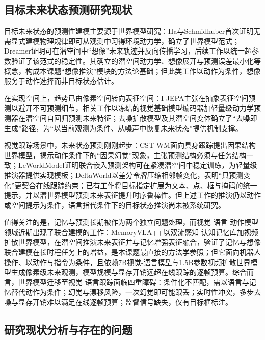 \subsection{目标未来状态预测研究现状}

目标未来状态的预测性建模主要源于世界模型研究：Ha与Schmidhuber\cite{ha2018worldmodels}首次证明无需显式建模物理规律即可从观测中习得环境动力学，确立了世界模型范式；Dreamer\cite{hafner2020dreamer}证明可在潜空间中“想像”未来轨迹并反向传播学习，后续工作以统一超参数验证了该范式的稳定性\cite{hafner2025mastering}。其确立的潜空间动力学、想像展开与预测误差最小化等概念，构成本课题“想像推演”模块的方法论基础；但此类工作以动作为条件，想像服务于动作选择而非目标状态估计。

在实现空间上，趋势已由像素空间转向表征空间：I-JEPA\cite{assran2023ijepa}主张在抽象表征空间预测以避开不可预测细节，相关工作以冻结的视觉基础模型编码器加轻量级动力学预测器在潜空间自回归预测未来特征\cite{kerssies2026delta}；去噪扩散模型及其潜空间变体确立了“去噪即生成”路径\cite{ho2020ddpm,rombach2022ldm}，为“以当前观测为条件、从噪声中恢复未来状态”提供机制支撑。

视觉跟踪场景中，未来状态预测刚刚起步：CST-WM\cite{hu2026cstwm}面向具身跟踪提出因果结构世界模型，揭示动作条件下的“因果幻觉”现象，主张预测结构必须与任务结构一致；LeWorldModel\cite{maes2026leworldmodel}证明联合嵌入预测架构可在紧凑潜空间中稳定训练，为轻量级推演器提供实现模板；DeltaWorld\cite{kerssies2026delta}以差分令牌压缩相邻帧变化，表明“只预测变化”更契合在线跟踪约束；已有工作将目标指定扩展为文本、点、框与掩码的统一提示，并以潜世界模型预测未来表征提升时序鲁棒性\cite{xie2026uss}。但上述工作的推演仍以动作或空间提示为条件，语言指代条件下的目标状态推演尚未被系统研究。

值得关注的是，记忆与预测长期被作为两个独立问题处理，而视觉-语言-动作模型领域近期出现了联合建模的工作：MemoryVLA++\cite{shi2026memoryvla}以双流感知-认知记忆库加视频扩散世界模型，在潜空间推演未来表征并与记忆增强表征融合，验证了记忆与想像联合建模在长时程任务上的增益，是本课题最直接的方法学参照；但它面向机器人操作、以动作与指令为条件，且依赖7B视觉-语言模型与1.5B参数视频扩散世界模型生成像素级未来观测，模型规模与显存开销远超在线跟踪的逐帧预算。综合而言，世界模型迁移至视觉-语言跟踪面临四重障碍：条件化不匹配，需以语言与记忆替代动作为条件；幻觉与漂移风险，一次幻觉即可能跟丢；实时性冲突，多步去噪与显存开销难以满足在线逐帧预算；监督信号缺失，仅有目标框标注。

\subsection{研究现状分析与存在的问题}

